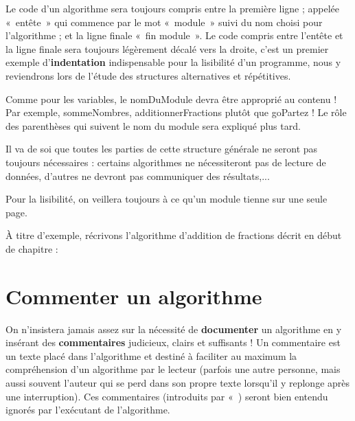 		\begin{liste}
		\item {
			Le code d'un algorithme sera toujours compris entre la
			première ligne ; appelée «~entête~» qui commence par le mot «~module~»
			suivi du nom choisi pour l'algorithme ; et la ligne
			finale «~fin module~». Le code compris entre l'entête
			et la ligne finale sera toujours légèrement décalé vers la droite,
			c'est un premier exemple
			d'\textbf{indentation} indispensable pour la
			lisibilité d'un programme, nous y reviendrons lors de
			l'étude des structures alternatives et répétitives.}
		\item {
			Comme pour les variables, le nomDuModule devra être approprié au contenu
			! Par exemple, sommeNombres, additionnerFractions plutôt que goPartez
			!
			Le rôle des parenthèses qui suivent le nom du module sera expliqué plus
			tard.}
		\item {
			Il va de soi que toutes les parties de cette structure générale ne
			seront pas toujours nécessaires : certains algorithmes ne nécessiteront
			pas de lecture de données, d'autres ne devront pas
			communiquer des résultats,...}
		\item {
			Pour la lisibilité, on veillera toujours à ce qu'un module
			tienne sur une seule page.}
		\end{liste}

		À titre d’exemple, récrivons l’algorithme d’addition de fractions décrit
		en début de chapitre :


	\section{Commenter un algorithme}

		On n’insistera jamais assez sur la nécessité de \textbf{documenter} un
		algorithme en y insérant des \textbf{commentaires} judicieux, clairs et
		suffisants ! Un commentaire est un texte placé dans
		l'algorithme et destiné à faciliter au maximum la
		compréhension d’un algorithme par le lecteur (parfois une autre
		personne, mais aussi souvent l'auteur qui se perd dans
		son propre texte lorsqu'il y replonge après une
		interruption). Ces commentaires (introduits par
		«~) seront bien entendu ignorés par
		l’exécutant de l’algorithme.

